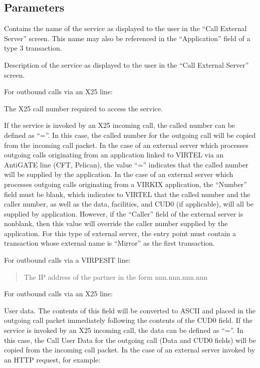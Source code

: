 \documentclass[letterpaper,10pt,english]{sphinxmanual}
\begin{document}
\subsection{Parameters}
\label{\detokenize{connectivity_guide:index-137}}\label{\detokenize{connectivity_guide:id73}}\begin{description}
\sphinxAtStartPar
Contains the name of the service as displayed to the user in the “Call External Server” screen. This name may also be referenced in the “Application” field of a type 3 transaction.

\sphinxAtStartPar
Description of the service as displayed to the user in the “Call External Server” screen.

\sphinxAtStartPar
For outbound calls via an X25 line:

\sphinxAtStartPar
The X25 call number required to access the service.

\sphinxAtStartPar
If the service is invoked by an X25 incoming call, the called number can be defined as “=”. In this case, the called number for the outgoing call will be copied from the incoming call packet. In the case of an external server which processes outgoing calls originating from an application linked to VIRTEL via an AntiGATE line (CFT, Pelican), the value “=” indicates that the called number will be supplied by the application. In the case of an external server which processes outgoing calls originating from a VIRKIX application, the “Number” field must be blank, which indicates to VIRTEL that the called number and the caller number, as well as the data, facilities, and CUD0 (if applicable), will all be supplied by application. However, if the “Caller” field of the external server is non\sphinxhyphen{}blank, then this value will override the caller number supplied by the application. For this type of external server, the entry point must contain a transaction whose external name is “Mirror” as the first transaction.

\sphinxAtStartPar
For outbound calls via a VIRPESIT line:
\begin{quote}

\sphinxAtStartPar
The IP address of the partner in the form nnn.nnn.nnn.nnn
\end{quote}

\sphinxAtStartPar
For outbound calls via an X25 line:

\sphinxAtStartPar
User data. The contents of this field will be converted to ASCII and placed in the outgoing call packet immediately following the contents of the CUD0 field. If the service is invoked by an X25 incoming call, the data can be defined as “=”. In this case, the Call User Data for the outgoing call (Data and CUD0 fields) will be copied from the incoming call packet. In the case of an external server invoked by an HTTP request, for example:

\end{description}
\end{document}

